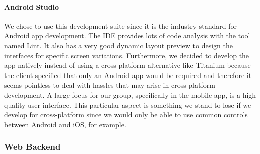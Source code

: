 \documentclass[11pt,a4paper,titlepage]{article}
\begin{document}
			\paragraph{Android Studio}
				We chose to use this development suite since it is the industry standard for Android app development. The IDE provides lots of code analysis with the tool named Lint. It also has a very good dynamic layout preview to design the interfaces for specific screen variations. Furthermore, we decided to develop the app natively instead of using a cross-platform alternative like Titanium because the client specified that only an Android app would be required and therefore it seems pointless to deal with hassles that may arise in cross-platform development. A large focus for our group, specifically in the mobile app, is a high quality user interface. This particular aspect is something we stand to lose if we develop for cross-platform since we would only be able to use common controls between Android and iOS, for example.
		\subsubsection{Web Backend}
\end{document}
